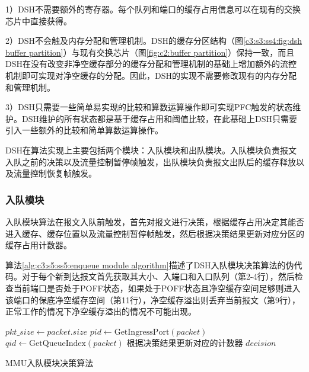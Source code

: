 1）DSH不需要额外的寄存器。每个队列和端口的缓存占用信息可以在现有的交换芯片中直接获得。

2）DSH不会触及内存分配和管理机制。DSH的缓存分区结构（图\ref{c3:s3:ss4:fig:dsh buffer partition}）与现有交换芯片（图\ref{fig:c2:buffer partition}）保持一致，而且DSH在没有改变非净空缓存部分的缓存分配和管理机制的基础上增加额外的流控机制即可实现对净空缓存的分配。因此，DSH的实现不需要修改现有的内存分配和管理机制。

3）DSH只需要一些简单易实现的比较和算数运算操作即可实现PFC触发的状态维护。DSH维护的所有状态都是基于缓存占用和阈值比较，在此基础上DSH只需要引入一些额外的比较和简单算数运算操作。

DSH在算法实现上主要包括两个模块：入队模块和出队模块。入队模块负责报文入队之前的决策以及流量控制暂停帧触发，出队模块负责报文出队后的缓存释放以及流量控制恢复帧触发。

\subsubsection{入队模块}
入队模块算法在报文入队前触发，首先对报文进行决策，根据缓存占用决定其能否进入缓存、缓存位置以及流量控制暂停帧触发，然后根据决策结果更新对应分区的缓存占用计数器。

算法\ref{alg:c3:s5:ss5:enqueue module algorithm}描述了DSH入队模块决策算法的伪代码。对于每个新到达报文首先获取其大小、入端口和入口队列（第2-4行），然后检查当前端口是否处于POFF状态，如果处于POFF状态且净空缓存空间足够则进入该端口的保底净空缓存空间（第11行），净空缓存溢出则丢弃当前报文（第9行），正常工作的情况下净空缓存溢出的情况不可能出现。

\begin{algorithm}[H]
  \small
  \SetAlCapFnt{\small}
  \SetAlCapNameFnt{\small}

  \SetAlgoVlined

  $pkt\_size \leftarrow packet.size$\;
  $pid \leftarrow \text{GetIngressPort}(packet)$\;
  $qid \leftarrow \text{GetQueueIndex}(packet)$\;
  根据决策结果更新对应的计数器\;
  \Return $decision$\;
  \caption{MMU入队模块决策算法}
  \label{alg:c3:s5:ss5:enqueue module algorithm}
\end{algorithm}

